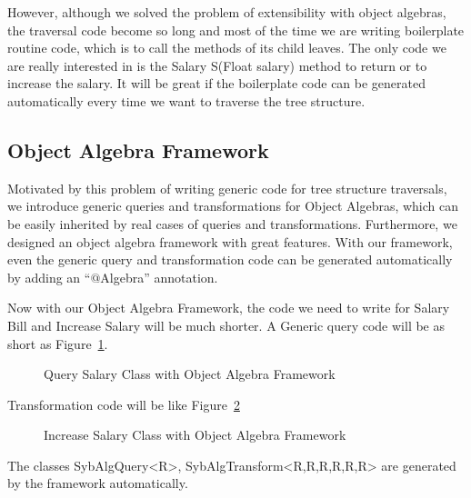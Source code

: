 However, although we solved the problem of extensibility with object algebras, the traversal code become so long and most of the time we are writing boilerplate routine code, which is to call the methods of its child leaves. The only code we are really interested in is the Salary S(Float salary) method to return or to increase the salary. It will be great if the boilerplate code can be generated automatically every time we want to traverse the tree structure. 

\subsection{Object Algebra Framework}
Motivated by this problem of writing generic code for tree structure traversals, we introduce generic queries and transformations for Object Algebras, which can be easily inherited by real cases of queries and transformations. Furthermore, we designed an object algebra framework with great features. With our framework, even the generic query and transformation code can be generated automatically by adding an ``$@$Algebra'' annotation. 

Now with our Object Algebra Framework, the code we need to write for Salary Bill and Increase Salary will be much shorter. A Generic query code will be as short as Figure~\ref{query_with_oaframework}. 
\begin{figure}[tb]
\vspace{-.1in}
\caption{Query Salary Class with Object Algebra Framework}
\label{query_with_oaframework}
\end{figure}
Transformation code will be like Figure~\ref{transform_with_oaframework}
\begin{figure}[tb]
\vspace{-.1in}
\caption{Increase Salary Class with Object Algebra Framework}
\label{transform_with_oaframework}
\end{figure}
The classes SybAlgQuery<R>, SybAlgTransform<R,R,R,R,R,R> are generated by the framework automatically. 